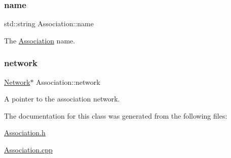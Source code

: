 \subsubsection{\texorpdfstring{name}{name}}
{\footnotesize\ttfamily std\+::string Association\+::name\hspace{0.3cm}{\ttfamily [private]}}



The \hyperlink{classAssociation}{Association} name. 

\mbox{\label{classAssociation_a6747cedd4ce14a3b890c8ac87f676192}} 
\subsubsection{\texorpdfstring{network}{network}}
{\footnotesize\ttfamily \hyperlink{classNetwork}{Network}$\ast$ Association\+::network\hspace{0.3cm}{\ttfamily [private]}}



A pointer to the association network. 



The documentation for this class was generated from the following files\+:\begin{DoxyCompactItemize}
\item 
\hyperlink{Association_8h}{Association.\+h}\item 
\hyperlink{Association_8cpp}{Association.\+cpp}\end{DoxyCompactItemize}
